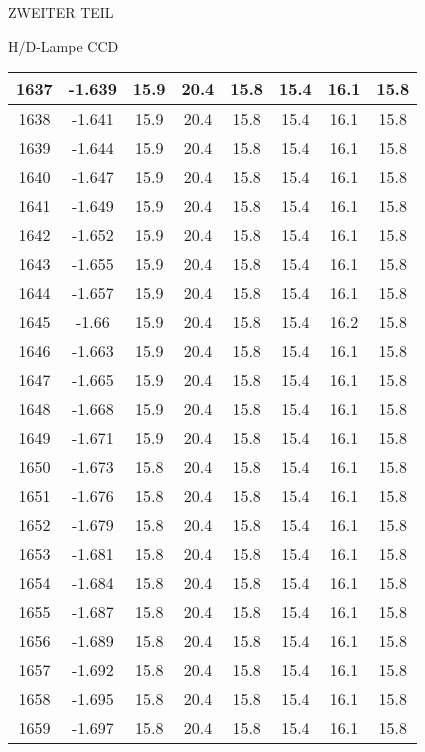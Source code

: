 \begin{appendix}
\begin{chapter}{ZWEITER TEIL}
\begin{section}{H/D-Lampe CCD}
\begin{scriptsize}
\begin{longtable}[htbp]{|c|c|c|c|c|c|c|c|}
            1637 & -1.639 & 15.9 & 20.4 & 15.8 & 15.4 & 16.1 & 15.8 \\ \hline
            1638 & -1.641 & 15.9 & 20.4 & 15.8 & 15.4 & 16.1 & 15.8 \\ \hline
            1639 & -1.644 & 15.9 & 20.4 & 15.8 & 15.4 & 16.1 & 15.8 \\ \hline
            1640 & -1.647 & 15.9 & 20.4 & 15.8 & 15.4 & 16.1 & 15.8 \\ \hline
            1641 & -1.649 & 15.9 & 20.4 & 15.8 & 15.4 & 16.1 & 15.8 \\ \hline
            1642 & -1.652 & 15.9 & 20.4 & 15.8 & 15.4 & 16.1 & 15.8 \\ \hline
            1643 & -1.655 & 15.9 & 20.4 & 15.8 & 15.4 & 16.1 & 15.8 \\ \hline
            1644 & -1.657 & 15.9 & 20.4 & 15.8 & 15.4 & 16.1 & 15.8 \\ \hline
            1645 & -1.66 & 15.9 & 20.4 & 15.8 & 15.4 & 16.2 & 15.8 \\ \hline
            1646 & -1.663 & 15.9 & 20.4 & 15.8 & 15.4 & 16.1 & 15.8 \\ \hline
            1647 & -1.665 & 15.9 & 20.4 & 15.8 & 15.4 & 16.1 & 15.8 \\ \hline
            1648 & -1.668 & 15.9 & 20.4 & 15.8 & 15.4 & 16.1 & 15.8 \\ \hline
            1649 & -1.671 & 15.9 & 20.4 & 15.8 & 15.4 & 16.1 & 15.8 \\ \hline
            1650 & -1.673 & 15.8 & 20.4 & 15.8 & 15.4 & 16.1 & 15.8 \\ \hline
            1651 & -1.676 & 15.8 & 20.4 & 15.8 & 15.4 & 16.1 & 15.8 \\ \hline
            1652 & -1.679 & 15.8 & 20.4 & 15.8 & 15.4 & 16.1 & 15.8 \\ \hline
            1653 & -1.681 & 15.8 & 20.4 & 15.8 & 15.4 & 16.1 & 15.8 \\ \hline
            1654 & -1.684 & 15.8 & 20.4 & 15.8 & 15.4 & 16.1 & 15.8 \\ \hline
            1655 & -1.687 & 15.8 & 20.4 & 15.8 & 15.4 & 16.1 & 15.8 \\ \hline
            1656 & -1.689 & 15.8 & 20.4 & 15.8 & 15.4 & 16.1 & 15.8 \\ \hline
            1657 & -1.692 & 15.8 & 20.4 & 15.8 & 15.4 & 16.1 & 15.8 \\ \hline
            1658 & -1.695 & 15.8 & 20.4 & 15.8 & 15.4 & 16.1 & 15.8 \\ \hline
            1659 & -1.697 & 15.8 & 20.4 & 15.8 & 15.4 & 16.1 & 15.8 \\ \hline

\end{longtable}
\end{scriptsize}
\end{section}
\end{chapter}
\end{appendix}
